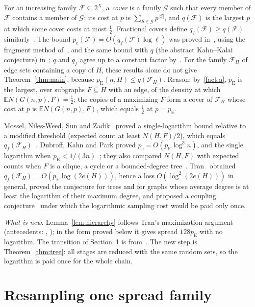 \documentclass[11pt]{article}
\numberwithin{equation}{section}
\newcommand{\EE}{\mathbb E}
\newcommand{\pc}{p_{\mathrm c}}
\newcommand{\pE}{p_{\mathrm E}}
\begin{document}
For an increasing family $\mathcal F\subseteq2^X$, a \emph{cover} is a
family $\mathcal G$ such that every member of $\mathcal F$ contains a
member of $\mathcal G$; its cost at $p$ is $\sum_{S\in\mathcal G}p^{|S|}$,
and $q(\mathcal F)$ is the largest $p$ at which some cover costs at most
$\tfrac12$. Fractional covers define $q_f(\mathcal F)\ge q(\mathcal F)$
similarly~\cite[Section~6]{Tal10}. The bound
$p_{\mathrm c}(\mathcal F)=O(q_f(\mathcal F)\log\ell)$ was proved
in~\cite{FKNP21}, using the fragment method of~\cite{ALWZ21,LSZ19}, and
the same bound with $q$ (the abstract Kahn--Kalai conjecture)
in~\cite{PP24}; $q$ and $q_f$ agree up to a constant factor
by~\cite[Theorem~1.1]{OpenAIThresholdEquivalence2026}. For the family
$\mathcal F_H$ of edge sets containing a copy of $H$, these results alone
do not give Theorem~\ref{thm:main}, because
$\pE(n,H)\le q(\mathcal F_H)$. Reason: by~\ref{fact:a}, $\pE$ is the
largest, over subgraphs $F\subseteq H$ with an edge, of the density at
which $\EE N(G(n,p),F)=\tfrac12$; the copies of a maximizing $F$ form a
cover of $\mathcal F_H$ whose cost at $p$ is $\EE N(G(n,p),F)$, which
equals $\tfrac12$ at $p=\pE$.

Mossel, Niles-Weed, Sun and Zadik~\cite[Theorem~1]{MNSZ22} proved a
single-logarithm bound relative to a modified threshold (expected count
at least $N(H,F)/2$), which equals
$q_f(\mathcal F_H)$~\cite[Equation~(1)]{DKP25}. Dubroff, Kahn and Park
proved $\pc=O(\pE\log^3n)$, and the single logarithm when
$\pE<1/(3n)$~\cite[Theorems~1.2--1.5]{DKP25}; they also compared $N(H,F)$
with expected counts when $F$ is a clique, a cycle or a bounded-degree
tree~\cite[Theorems~1.4--1.5]{DKP25Cases}. Tran~\cite{Tran26} obtained
$q_f(\mathcal F_H)=O(\pE\log(2e(H)))$, hence a loss $O(\log^2(2e(H)))$ in
general, proved the conjecture for trees and for graphs whose average
degree is at least the logarithm of their maximum degree, and proposed a
coupling conjecture~\cite[Section~4]{Tran26} under which the logarithmic
sampling cost would be paid only once.

\emph{What is new.} Lemma~\ref{lem:hierarchy} follows Tran's
maximization argument~\cite[Section~3]{Tran26} (antecedents:
\cite[Claim~29]{LSZ19}, \cite[Lemma~2.4]{ALWZ21}); in the form proved
below it gives spread $128\pE$ with no logarithm. The transition of
Section~\ref{sec:resampling} is from~\cite{MNSZ25}. The new step is
Theorem~\ref{thm:tree}: all stages are reduced with the same random sets,
so the logarithm is paid once for the whole chain.

\section{Resampling one spread family}\label{sec:resampling}
\end{document}

